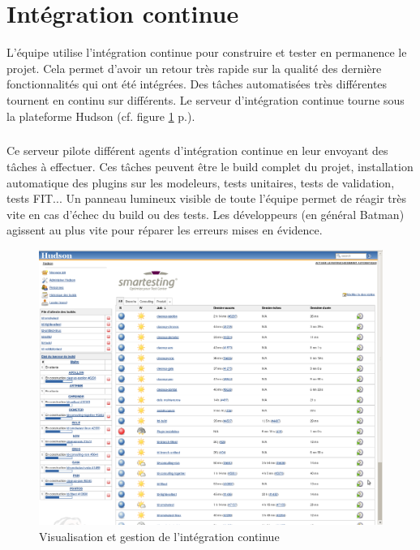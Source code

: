 \section{Intégration continue}
L'équipe utilise l'intégration continue pour construire et tester en permanence le projet. Cela permet d'avoir un retour très rapide sur la qualité des dernière fonctionnalités qui ont été intégrées. Des tâches automatisées très différentes tournent en continu sur différents. Le serveur d'intégration continue tourne sous la plateforme Hudson (cf. figure \ref{figure:hudson} p.\pageref{figure:hudson}). \subparagraph*{}
Ce serveur pilote différent agents d'intégration continue en leur envoyant des tâches à effectuer. Ces tâches peuvent être le build complet du projet, installation automatique des plugins sur les modeleurs, tests unitaires, tests de validation, tests FIT... Un panneau lumineux visible de toute l'équipe permet de réagir très vite en cas d'échec du build ou des tests. Les développeurs (en général Batman) agissent au plus vite pour réparer les erreurs mises en évidence.
\begin{figure}[!ht]
\centering
\includegraphics[width=\textwidth]{Illustrations/hudson.png}
\caption{Visualisation et gestion de l'intégration continue}
\label{figure:hudson}
\end{figure}
